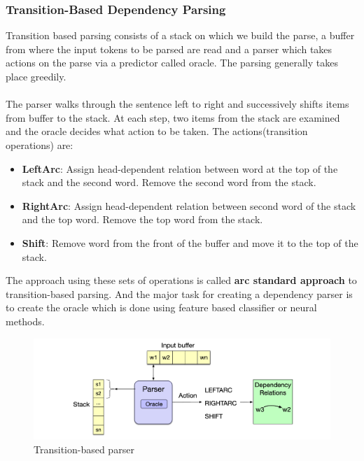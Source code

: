 \subsubsection*{Transition-Based Dependency Parsing}
Transition based parsing consists of a stack on which we build the parse, a
buffer from where the input tokens to be parsed are read and a parser which
takes actions on the parse via a predictor called oracle. The parsing generally
takes place greedily.
\\~\\
The parser walks through the sentence left to right and successively shifts
items from buffer to the stack. At each step, two items from the stack are
examined and the oracle decides what action to be taken. The actions(transition
operations) are:
\begin{itemize}
    \item \textbf{LeftArc}: Assign head-dependent relation between word at the top of the stack and the second word. Remove the second word from the stack.
    \item \textbf{RightArc}: Assign head-dependent relation between second word of the stack and the top word. Remove the top word from the stack.
    \item \textbf{Shift}: Remove word from the front of the buffer and move it to the top of the stack.
\end{itemize}
The approach using these sets of operations is called \textbf{arc standard
approach} to transition-based parsing. And the major task for creating a
dependency parser is to create the oracle which is done using feature based
classifier or neural methods.
\begin{figure}[!h]
    \center
    \includegraphics[scale=0.2]{images/transition_based_parser}
    \caption{Transition-based parser\cite{stanfordLec}}
    \label{fig:transition_based_parser}
\end{figure}

